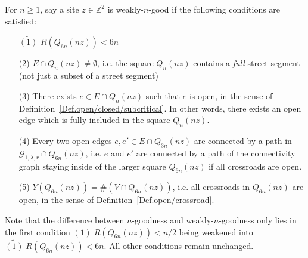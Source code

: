\documentclass[10pt,a4paper]{amsart}
\theoremstyle{exampstyle}
\theoremstyle{exampnotations}
\begin{document}
For $n \geq 1$, say a site $z \in \mathbb{Z}^{2}$ is weakly-$n$-good if the following conditions are satisfied:
\begin{enumerate}
\item[$\widetilde{(1)}$] $R(Q_{6n}(nz)) < 6n$
\item[(2)]  $E \cap Q_n(nz) \neq \emptyset$, i.e. the square $Q_n(nz)$ contains a \emph{full} street segment (not just a subset of a street segment)
\item[(3)]  There exists $e \in E \cap Q_n(nz)$ such that $e$ is open, in the sense of Definition~\ref{Def.open/closed/subcritical}. In other words, there exists an open edge which is fully included in the square $Q_n(nz)$.
\item[(4)]  Every two open edges $e,e' \in E \cap Q_{3n}(nz)$ are connected by a path in $\mathcal{G}_{1,\lambda,r}\cap Q_{6n}(nz)$, i.e. $e$ and $e'$ are connected by a path of the connectivity graph staying inside of the larger square $Q_{6n}(nz)$ if all crossroads are open.
\item[(5)]  $Y(Q_{6n}(nz)) = \#(V \cap Q_{6n}(nz))$, i.e. all crossroads in $Q_{6n}(nz)$ are open, in the sense of Definition~\ref{Def.open/crossroad}.
\end{enumerate}
Note that the difference between $n$-goodness and weakly-$n$-goodness only lies in the first condition $(1) \; R(Q_{6n}(nz))<n/2$ being weakened into $\widetilde{(1)} \; R(Q_{6n}(nz))< 6n$. All other conditions remain unchanged. \\
\end{document}
